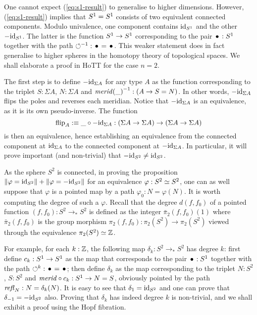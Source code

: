 \documentclass{easychair}
\newcommand{\Sp}{{S^2}}%
\newcommand{\mrd}{\mathit{merid}}%
\newcommand{\susp}[1]{\Sigma{#1}}%
\newcommand{\ptdto}{\to_\ast}%
\newcommand{\flip}{\operatorname{flip}}%
\def\blank{\_}%
\begin{document}
One cannot expect (\ref{eq:s1-result}) to generalise to higher
dimensions. However, (\ref{eq:s1-result}) implies that ${S^1} = {S^1}$
consists of two equivalent connected components. Modulo univalence,
one component contains $\mathord{\mathrm{id}}_{S^1}$ and the other $-\mathord{\mathrm{id}}_{S^1}$. The latter
is the function ${S^1} \to {S^1}$ corresponding to the pair $\base:\Sc$
together with the path $\inv\Sloop:\base=\base$. This weaker statement
does in fact generalise to higher spheres in the homotopy theory of
topological spaces. We shall elaborate a proof in HoTT for the case
$n=2$. %

The first step is to define $-\id_{\susp A}$ for any type $A$ as the
function corresponding to the triplet $S:\susp A$, $N:\susp A$ and
$\inv{\mrd(\blank)} : (A \to S=N)$. In other words, $-\id_{\susp A}$
flips the poles and reverses each meridian. Notice that
$-\id_{\susp A}$ is an equivalence, as it is its own
pseudo-inverse. The function
\begin{displaymath}
  \flip_A \defequi \blank \circ -\id_{\susp A} : (\susp A \to \susp A) \to (\susp A \to \susp A)
\end{displaymath}
is then an equivalence, hence establishing an equivalence from the
connected component at $\id_{\susp A}$ to the connected component at
$-\id_{\susp A}$.  In particular, it will prove important (and
non-trivial) that $-\id_{\Sp} \neq \id_{\Sp}$.

As the sphere $\Sp$ is connected, in proving the proposition
$\Trunc{\varphi=\id_\Sp}+\Trunc{\varphi=-\id_\Sp}$ for an equivalence
$\varphi:\Sp \weq \Sp$, one can as well suppose that $\varphi$ is a
pointed map by a path $\varphi_0:N=\varphi(N)$. It is worth computing
the degree of such a $\varphi$. Recall that the degree $d(f,f_0)$ of a
pointed function $(f,f_0):\Sp \ptdto\Sp$ is defined as the integer
$\bar \pi_2(f,f_0)(1)$ where $\bar\pi_2(f,f_0)$ is the group morphism
$\pi_2(f,f_0) : \pi_2(\Sp) \to \pi_2(\Sp)$ viewed through the
equivalence $\pi_2(\Sp) \weq \ZZ$.

For example, for each $k:\mathbb{Z}$, the following map
$\delta_k : \Sp \ptdto \Sp$ has degree $k$: first define
$c_k:{S^1}\to{S^1}$ as the map that corresponds to the pair $\base:\Sc$
together with the path $\Sloop^k:\base=\base$; then define $\delta_k$
as the map corresponding to the triplet $N:\Sp$, $S:\Sp$ and
$\mrd{}\circ c_k: \Sc \to N=S$, obviously pointed by the path
$\mathop{{\mathit{refl}}_{N}}:N=\delta_k(N)$.  It is easy to see that
$\delta_1 = \id_{\Sp}$ and one can prove that
$\delta_{-1} = -\id_{\Sp}$ also.  Proving that $\delta_k$ has indeed
degree $k$ is non-trivial, and we shall exhibit a proof using the Hopf
fibration.
\end{document}
